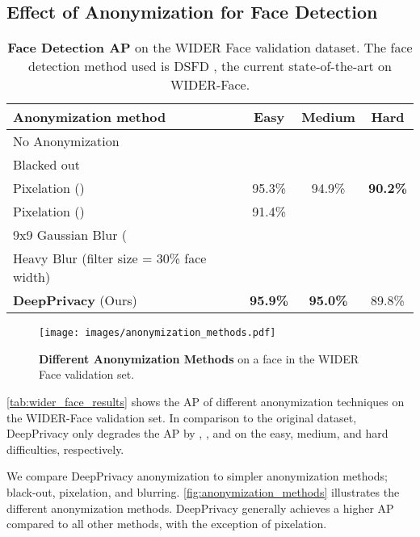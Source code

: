 \documentclass[runningheads]{llncs}
\begin{document}
\subsection{Effect of Anonymization for Face Detection}

\begin{table}
	\centering
	\caption[Average Precision on WIDER-Face validation set]{\textbf{Face Detection AP} on the WIDER Face \cite{yang2016wider} validation dataset. The face detection method used is DSFD \cite{li2018dsfd}, the current state-of-the-art on WIDER-Face. }
	\begin{tabular}{l|ccc}
		\hline
		Anonymization method & Easy & Medium & Hard \\
		\hline
		No Anonymization \cite{li2018dsfd} &  &   &  \\
		\hline
		
		Blacked out &  &   &  \\
		Pixelation () & 95.3\% & 94.9\% & \textbf{90.2\%} \\ 
		Pixelation () & 91.4\% &  &  \\ 
		9x9 Gaussian Blur ( &  &   &  \\
		Heavy Blur (filter size = 30\% face width) &  &   &  \\
		\textbf{DeepPrivacy} (Ours) & \textbf{95.9\%} & \textbf{95.0\%} & 89.8\% \\
		\hline
		
	\end{tabular}
	\vspace{2mm}

	\label{tab:wider_face_results}
\end{table}

\begin{figure}
    \centering
    \texttt{[image: images/anonymization\_methods.pdf]}
    \caption{\textbf{Different Anonymization Methods} on a face in the WIDER Face validation set.}
    \label{fig:anonymization_methods}
\end{figure}

\autoref{tab:wider_face_results} shows the AP of different anonymization techniques on the WIDER-Face validation set.
In comparison to the original dataset, DeepPrivacy only degrades the AP by , , and  on the easy, medium, and hard difficulties, respectively.




We compare DeepPrivacy anonymization to simpler anonymization methods; black-out, pixelation, and blurring. \autoref{fig:anonymization_methods} illustrates the different anonymization methods. 
DeepPrivacy generally achieves a higher AP compared to all other methods, with the exception of  pixelation.
\end{document}
